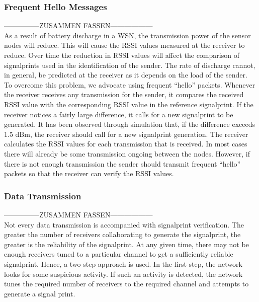 \documentclass[12pt,a4paper]{article}
\begin{document}
\subsubsection*{Frequent Hello Messages}
---------------ZUSAMMEN FASSEN------------------\\
As a result of battery
discharge in a WSN, the transmission power of the
sensor nodes will reduce. This will cause the RSSI
values measured at the receiver to reduce. Over time
the reduction in RSSI values will affect the
comparison of signalprints used in the identification
of the sender. The rate of discharge cannot, in
general, be predicted at the receiver as it depends on
the load of the sender. To overcome this problem,
we advocate using frequent “hello” packets.
Whenever the receiver receives any transmission for
the sender, it compares the received RSSI value with
the corresponding RSSI value in the reference
signalprint. If the receiver notices a fairly large
difference, it calls for a new signalprint to be
generated. It has been observed through simulation
that, if the difference exceeds 1.5 dBm, the receiver
should call for a new signalprint generation. The
receiver calculates the RSSI values for each
transmission that is received. In most cases there will
already be some transmission ongoing between the
nodes. However, if there is not enough transmission
the sender should transmit frequent “hello” packets
so that the receiver can verify the RSSI values.

\subsubsection*{Data Transmission}
---------------ZUSAMMEN FASSEN------------------\\
Not every data transmission is
accompanied with signalprint verification. The
greater the number of receivers collaborating to
generate the signalprint, the greater is the reliability
of the signalprint. At any given time, there may not
be enough receivers tuned to a particular channel to
get a sufficiently reliable signalprint. Hence, a two
step approach is used. In the first step, the network
looks for some suspicious activity. If such an activity
is detected, the network tunes the required number of
receivers to the required channel and attempts to
generate a signal print.

\begin{comment}
\href{https://www.pc-magazin.de/ratgeber/das-muessen-sie-ueber-lte-wissen-1277030.html}{(hier klicken)}
\end{comment}
\end{document}
